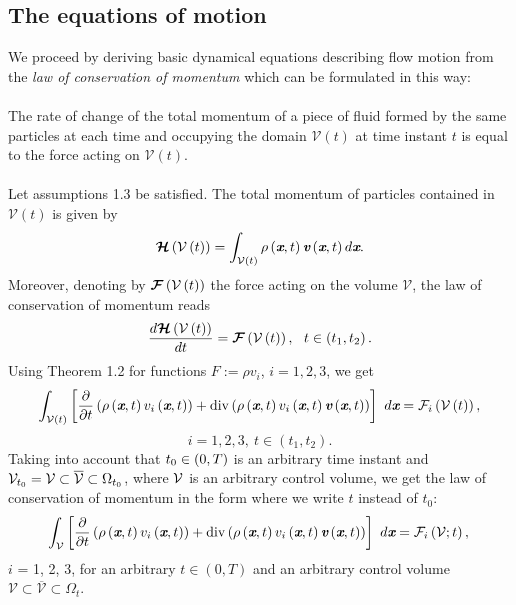 \subsection{The equations of motion}
We proceed by deriving basic dynamical equations describing flow motion from the \textit{law of conservation of momentum} which can be formulated in this way:
\itshape
\paragraph{}
The rate of change of the total momentum of a piece of fluid formed by the same particles at each time and occupying the domain $\mathcal{V}\left(t\right)$ at time instant $t$ is equal to the force acting on $\mathcal{V}\left(t\right).$
\upshape
\paragraph{}
Let assumptions 1.3 be satisfied. The total momentum of particles contained in $\mathcal{V}\left(t\right)$ is given by
\begin{equation}\label{moment_1}
 \boldsymbol{\mathcal{H}}\left(\mathcal{V}\left(t\right)\right)= \int_{\mathcal{V}\left(t\right)}\rho\left(\textit{\textbf{x}},t\right)\textit{\textbf{v}}\left(\textit{\textbf{x}},t\right)d\textit{\textbf{x}}.
\end{equation}
Moreover, denoting by $\boldsymbol{\mathcal{F}}\left(\mathcal{V}\left(t\right)\right)$ the force acting on the volume $\mathcal{V}$, the law of conservation of momentum reads
\begin{equation}\label{moment_2}
 \d{\bsm{\mathcal{H}}\left(\mathcal{V}\left(t\right)\right)}{t}=\bsm{\mathcal{F}}\left(\mathcal{V}\left(t\right)\right),\ \ t\in\left(t_1,t_2\right).
\end{equation}
Using Theorem 1.2 for functions $F:=\rho{v}_i$, $i=1, 2, 3$, we get
\begin{equation}
 \int_{\mathcal{V}\left(t\right)}\left[\pds{}{t}\left(\rho\left(\bs{x},t\right)v_i\left(\bs{x},t\right)\right)+\mathrm{div}
\left(\rho\left(\bs{x},t\right)v_i\left(\bs{x},t\right)\bs{v}\left(\bs{x},t\right)\right)\right]\ d\bs{x}= \mathcal{F}_i\left(\mathcal{V}\left(t\right)\right),
\end{equation}
\begin{equation}
i = 1, 2, 3,\ t\in\left(t_1,t_2\right). \nonumber
\end{equation}
Taking into account that $t_0\in\left({}0,T\right) $ is an arbitrary time instant and $\mathcal{V}_{t_0}=\mathcal{V}\subset\overline{\mathcal{V}}\subset\Omega_{t_0}$, where $\mathcal{V}$ is an arbitrary control volume, we get the law of conservation of momentum in the form where we write $t$ instead of $t_0$:
\begin{equation}\label{motion}
  \int_{\mathcal{V}}\left[\pds{}{t}\left(\rho\left(\bs{x},t\right)v_i\left(\bs{x},t\right)\right)+\mathrm{div}
\left(\rho\left(\bs{x},t\right)v_i\left(\bs{x},t\right)\bs{v}\left(\bs{x},t\right)\right)\right]\ d\bs{x}= \mathcal{F}_i\left(\mathcal{V};t\right),\\
\end{equation}
$i$ = 1, 2, 3, for an arbitrary $t\in\left(0,T\right)$ and an arbitrary control volume $\mathcal{V}\subset\overline{\mathcal{V}}\subset\Omega_t$.
